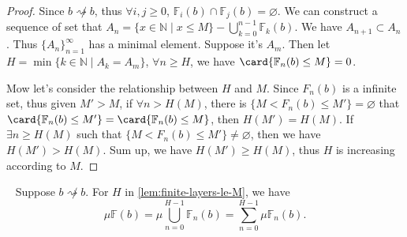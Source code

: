 \begin{proof}
	Since $b\not\rightsquigarrow b$, thus $\forall i, j \ge 0$, $\mathbb{F}_{i}(b)\cap \mathbb{F}_{j}(b) = \varnothing$.
	We can construct a sequence of set that $A_{n} = \{x\in\mathbb{N} \mid x \le M\} - \bigcup_{k=0}^{n-1}\mathbb{F}_{k}(b)$. We have $A_{n+1} \subset A_{n}$. Thus $\{A_n\}_{n=1}^{\infty}$ has a minimal element. Suppose it's $A_m$. Then let $ H = \min\{k\in\mathbb{N}\mid A_{k} = A_{m}\}$, $\forall n\ge H$, we have $\card\{\mathbb{F}_{n}(b)\le M\} = 0$.

	Mow let's consider the relationship between $H$ and $M$. Since $F_{n}(b)$ is a infinite set, thus given $ M' > M$, if $\forall n > H(M)$, there is $\{M < F_{n}(b) \le M' \} = \varnothing$ that $\card\{\mathbb{F}_{n}(b)\le M'\} = \card\{\mathbb{F}_{n}(b)\le M\}$, then $H(M') = H(M)$. If $\exists n\ge H(M)$ such that $\{M < F_{n}(b) \le M' \} \ne \varnothing$, then we have $H(M') > H(M)$. Sum up, we have $H(M') \ge H(M)$, thus $H$ is increasing according to $M$.
\end{proof}
\begin{lemma}~\label{lem:source-value-set-finite-decomposition}
	Suppose $b\not\rightsquigarrow b$. For $H$ in \cref{lem:finite-layers-le-M}, we have
	\[ \mu\mathbb{F}(b) = \mu\bigcup_{n=0}^{H-1}\mathbb{F}_{n}(b) = \sum_{n=0}^{H-1}\mu\mathbb{F}_{n}(b). \]
\end{lemma}
